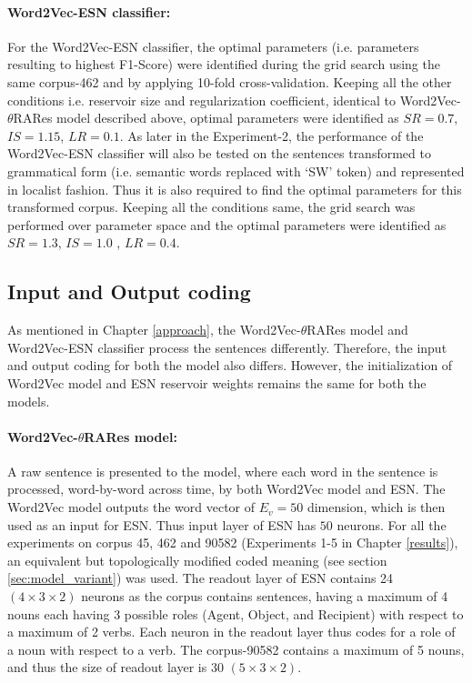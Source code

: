 \paragraph{Word2Vec-ESN classifier: } For the Word2Vec-ESN classifier, the optimal parameters (i.e. parameters resulting to highest F1-Score) were identified during the grid search using the same corpus-462 and by applying 10-fold cross-validation. Keeping all the other conditions i.e. reservoir size and regularization coefficient, identical to Word2Vec-$\theta$RARes model described above, optimal parameters were identified as $SR = 0.7$, $IS = 1.15$, $LR = 0.1$. As later in the Experiment-2, the performance of the Word2Vec-ESN classifier will also be tested on the sentences transformed to grammatical form (i.e. semantic words replaced with `SW' token) and represented in localist fashion. Thus it is also required to find the optimal parameters for this transformed corpus. Keeping all the conditions same, the grid search was performed over parameter space and the optimal parameters were identified as $SR = 1.3$, $IS = 1.0$ , $LR = 0.4$. 

\subsection{Input and Output coding}

As mentioned in Chapter \ref{approach}, the Word2Vec-$\theta$RARes model and Word2Vec-ESN classifier process the sentences differently. Therefore, the input and output coding for both the model also differs. However, the initialization of Word2Vec model and ESN reservoir weights remains the same for both the models. 

\paragraph{Word2Vec-$\theta$RARes model:}

A raw sentence is presented to the model, where each word in the sentence is processed, word-by-word across time, by both Word2Vec model and ESN. The Word2Vec model outputs the word vector of $E_{v} = 50$ dimension, which is then used as an input for ESN. Thus input layer of ESN has $50$ neurons. For all the experiments on corpus 45, 462 and 90582 (Experiments 1-5 in Chapter \ref{results}), an equivalent but topologically modified coded meaning (see section \ref{sec:model_variant}) was used. The readout layer of ESN contains 24 $(4 \times 3 \times 2)$ neurons as the corpus contains sentences, having a maximum of 4 nouns each having 3 possible roles (Agent, Object, and Recipient) with respect to a maximum of 2 verbs. Each neuron in the readout layer thus codes for a role of a noun with respect to a verb. The corpus-90582 contains a maximum of 5 nouns, and thus the size of readout layer is 30 $(5 \times 3 \times 2)$. 

